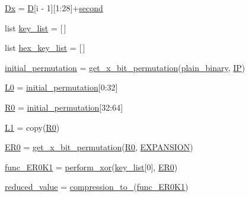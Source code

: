 \begin{DoxyCompactItemize}
\item 
\hyperlink{namespaceDESKeygen_aea3b6f6658e81a15d8e287c4f3667715}{Dx} = \hyperlink{namespaceDESKeygen_a4618ae9ac43c9af4a7a018eae1507c3c}{D}\mbox{[}i -\/ 1\mbox{]}\mbox{[}1\+:28\mbox{]}+\hyperlink{namespaceDESKeygen_a90b4cb951d052552ff184daf0e2428b2}{second}
\item 
list \hyperlink{namespaceDESKeygen_ae1fb953515172c35a43f6d1b1ad059d2}{key\+\_\+list} = \mbox{[}$\,$\mbox{]}
\item 
list \hyperlink{namespaceDESKeygen_ad0f1d71e576a17dbeba9f85fe469829a}{hex\+\_\+key\+\_\+list} = \mbox{[}$\,$\mbox{]}
\item 
\hyperlink{namespaceDESKeygen_aeb9fe34cab63037e4276a74f8f3ffc5c}{initial\+\_\+permutation} = \hyperlink{namespaceDESKeygen_a54842a0190e5d94c214033d9d9b8acfe}{get\+\_\+x\+\_\+bit\+\_\+permutation}(\hyperlink{namespaceDESKeygen_a493d3c517f0465c6e02e159d6fc7698e}{plain\+\_\+binary}, \hyperlink{namespaceDESKeygen_a6ccc6c2aae713404c9ba45ca7959a85c}{IP})
\item 
\hyperlink{namespaceDESKeygen_a4e5c92568bcd7f5d99323f378860bf9d}{L0} = \hyperlink{namespaceDESKeygen_aeb9fe34cab63037e4276a74f8f3ffc5c}{initial\+\_\+permutation}\mbox{[}0\+:32\mbox{]}
\item 
\hyperlink{namespaceDESKeygen_a69b702b5d982f05779ac0c29e54bb451}{R0} = \hyperlink{namespaceDESKeygen_aeb9fe34cab63037e4276a74f8f3ffc5c}{initial\+\_\+permutation}\mbox{[}32\+:64\mbox{]}
\item 
\hyperlink{namespaceDESKeygen_a30327764187e06393c03bad43c2dc79a}{L1} = copy(\hyperlink{namespaceDESKeygen_a69b702b5d982f05779ac0c29e54bb451}{R0})
\item 
\hyperlink{namespaceDESKeygen_a37a1e1e67c012d08675df6566f98965b}{E\+R0} = \hyperlink{namespaceDESKeygen_a54842a0190e5d94c214033d9d9b8acfe}{get\+\_\+x\+\_\+bit\+\_\+permutation}(\hyperlink{namespaceDESKeygen_a69b702b5d982f05779ac0c29e54bb451}{R0}, \hyperlink{namespaceDESKeygen_af93868fb830bf819ba3a974f70268bc3}{E\+X\+P\+A\+N\+S\+I\+ON})
\item 
\hyperlink{namespaceDESKeygen_a4d187125752e3fdcb87d8aa96ba0de87}{func\+\_\+\+E\+R0\+K1} = \hyperlink{namespaceDESKeygen_ad8cc7c44b9ccc58a64ae4794d018024a}{perform\+\_\+xor}(\hyperlink{namespaceDESKeygen_ae1fb953515172c35a43f6d1b1ad059d2}{key\+\_\+list}\mbox{[}0\mbox{]}, \hyperlink{namespaceDESKeygen_a37a1e1e67c012d08675df6566f98965b}{E\+R0})
\item 
\hyperlink{namespaceDESKeygen_a4bbbb736b16854d40efe76c80b618630}{reduced\+\_\+value} = \hyperlink{namespaceDESKeygen_a666d1d02c8340e03317dd6480555b8d9}{compression\+\_\+to\+\_}(\hyperlink{namespaceDESKeygen_a4d187125752e3fdcb87d8aa96ba0de87}{func\+\_\+\+E\+R0\+K1})

\end{DoxyCompactItemize}
